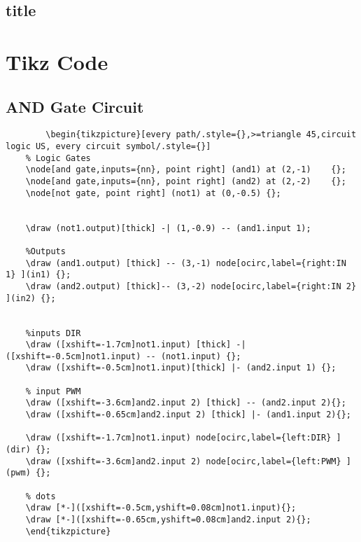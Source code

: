 \subsection{title}

\section{Tikz Code}
\subsection{AND Gate Circuit}

\begin{verbatim}
		\begin{tikzpicture}[every path/.style={},>=triangle 45,circuit logic US, every circuit symbol/.style={}]
	% Logic Gates
	\node[and gate,inputs={nn}, point right] (and1) at (2,-1)    {};
	\node[and gate,inputs={nn}, point right] (and2) at (2,-2)    {};
	\node[not gate, point right] (not1) at (0,-0.5) {};
	
	
	\draw (not1.output)[thick] -| (1,-0.9) -- (and1.input 1);
	
	%Outputs
	\draw (and1.output) [thick] -- (3,-1) node[ocirc,label={right:IN 1} ](in1) {};
	\draw (and2.output) [thick]-- (3,-2) node[ocirc,label={right:IN 2} ](in2) {};
	
	
	%inputs DIR
	\draw ([xshift=-1.7cm]not1.input) [thick] -| ([xshift=-0.5cm]not1.input) -- (not1.input) {};
	\draw ([xshift=-0.5cm]not1.input)[thick] |- (and2.input 1) {};
	
	% input PWM
	\draw ([xshift=-3.6cm]and2.input 2) [thick] -- (and2.input 2){};
	\draw ([xshift=-0.65cm]and2.input 2) [thick] |- (and1.input 2){};
	
	\draw ([xshift=-1.7cm]not1.input) node[ocirc,label={left:DIR} ](dir) {};
	\draw ([xshift=-3.6cm]and2.input 2) node[ocirc,label={left:PWM} ](pwm) {};
	
	% dots
	\draw [*-]([xshift=-0.5cm,yshift=0.08cm]not1.input){};
	\draw [*-]([xshift=-0.65cm,yshift=0.08cm]and2.input 2){};
	\end{tikzpicture}
\end{verbatim}


